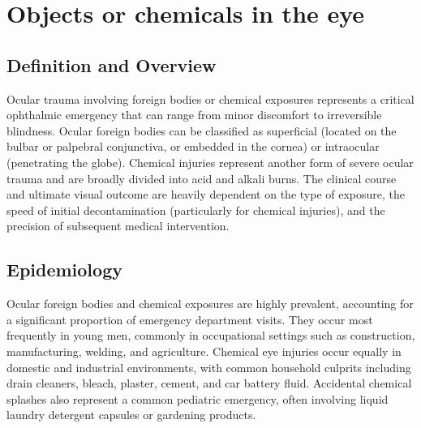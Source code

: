 \chapter{Objects or chemicals in the eye}

\section*{Definition and Overview}
Ocular trauma involving foreign bodies or chemical exposures represents a critical ophthalmic emergency that can range from minor discomfort to irreversible blindness. Ocular foreign bodies can be classified as superficial (located on the bulbar or palpebral conjunctiva, or embedded in the cornea) or intraocular (penetrating the globe). Chemical injuries represent another form of severe ocular trauma and are broadly divided into acid and alkali burns. The clinical course and ultimate visual outcome are heavily dependent on the type of exposure, the speed of initial decontamination (particularly for chemical injuries), and the precision of subsequent medical intervention.

\section*{Epidemiology}
Ocular foreign bodies and chemical exposures are highly prevalent, accounting for a significant proportion of emergency department visits. They occur most frequently in young men, commonly in occupational settings such as construction, manufacturing, welding, and agriculture. Chemical eye injuries occur equally in domestic and industrial environments, with common household culprits including drain cleaners, bleach, plaster, cement, and car battery fluid. Accidental chemical splashes also represent a common pediatric emergency, often involving liquid laundry detergent capsules or gardening products.

